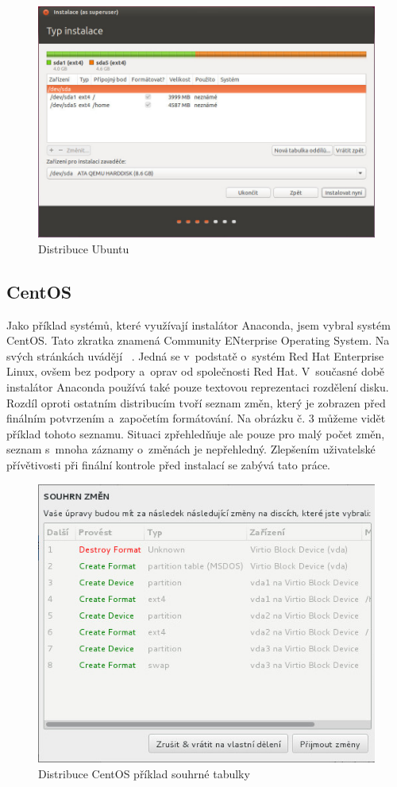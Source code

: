 \documentclass[color,table,oneside,nolot,nolof]{fithesis}
\begin{document}
\begin{figure}[hb]
	\label{fig:ubuntu}
	\caption{Distribuce Ubuntu}
	\centering
	\includegraphics[width=.6\columnwidth]{pictures/ubuntu1.jpg}
\end{figure}

\subsection{CentOS}

Jako příklad systémů, které využívají instalátor Anaconda, jsem vybral systém CentOS. Tato zkratka znamená Community ENterprise Operating System. Na svých stránkách uvádějí ~\cite{CentOS}. Jedná se v~podstatě o~systém Red Hat Enterprise 
Linux, ovšem bez podpory a~oprav od společnosti Red Hat. V~současné době instalátor Anaconda používá také pouze textovou reprezentaci rozdělení disku. Rozdíl oproti ostatním distribucím tvoří 
seznam změn, který je zobrazen před finálním potvrzením a~započetím formátování. Na obrázku č. 3 můžeme vidět příklad tohoto seznamu. Situaci zpřehledňuje ale pouze pro malý počet změn, seznam s~mnoha 
záznamy o~změnách je nepřehledný. Zlepšením uživatelské přívětivosti při finální kontrole před instalací se zabývá tato práce.

\begin{figure}[h]
	\label{fig:centos2}
	\caption{Distribuce CentOS příklad souhrné tabulky}
	\centering
	\includegraphics[width=.6\columnwidth]{pictures/centos3.jpg}
\end{figure}
\end{document}
